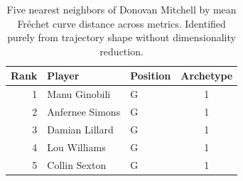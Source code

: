 \begin{table}[htbp]
  \centering\small
  \begin{tabular}{rllc}
    \toprule
    Rank & Player & Position & Archetype \\
    \midrule
    1 & Manu Ginobili & G & 1 \\
    2 & Anfernee Simons & G & 1 \\
    3 & Damian Lillard & G & 1 \\
    4 & Lou Williams & G & 1 \\
    5 & Collin Sexton & G & 1 \\
    \bottomrule
  \end{tabular}
  \caption{Five nearest neighbors of Donovan Mitchell by mean Fr\'{e}chet curve distance across metrics. Identified purely from trajectory shape without dimensionality reduction.}
  \label{tab:Donovan_Mitchell_frechet_curve_neighbors}
\end{table}

